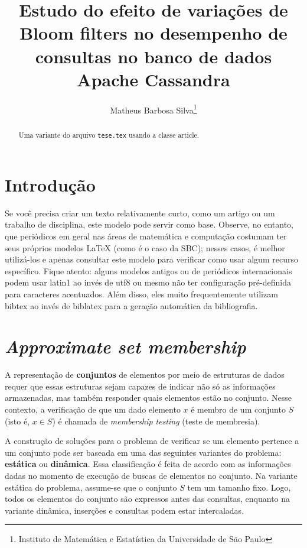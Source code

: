 \documentclass[12pt,twoside,english,brazilian]{article}
\title{Estudo do efeito de variações de Bloom filters no desempenho de consultas no banco de dados Apache Cassandra}
\author{
  Matheus Barbosa Silva\thanks{Instituto de Matemática e Estatística da Universidade de São Paulo}
}
\date{}
\begin{document}
\maketitle

\begin{abstract}
  Uma variante do arquivo \texttt{tese.tex} usando a classe \textsf{article}.
\end{abstract}

\section{Introdução}

Se você precisa criar um texto relativamente curto, como um artigo ou
um trabalho de disciplina, este modelo pode servir como base. Observe,
no entanto, que periódicos em geral nas áreas de matemática e computação
costumam ter seus próprios modelos \LaTeX{} (como é o caso da
SBC\nocite{sbctemplate});
nesses casos, é melhor utilizá-los e apenas consultar este modelo para
verificar como usar algum recurso específico. Fique atento: alguns modelos
antigos ou de periódicos internacionais podem usar \textsf{latin1} ao
invés de \textsf{utf8} ou mesmo não ter configuração pré-definida para
caracteres acentuados. Além disso, eles muito frequentemente utilizam
bibtex ao invés de biblatex para a geração automática da bibliografia.

\newpage

\section{\textit{Approximate set membership}}

A representação de \textbf{conjuntos} de elementos por meio de estruturas de dados requer que essas estruturas sejam capazes de indicar não só as informações armazenadas, mas também responder quais elementos estão no conjunto. Nesse contexto, a verificação de que um dado elemento $x$ é membro de um conjunto $S$ (isto é, $x \in S$) é chamada de \textit{membership testing} (teste de membresia).

A construção de soluções para o problema de verificar se um elemento pertence a um conjunto pode ser baseada em uma das seguintes variantes do problema: \textbf{estática} ou \textbf{dinâmica}. Essa classificação é feita de acordo com as informações dadas no momento de execução de buscas de elementos no conjunto. Na variante estática do problema, assume-se que o conjunto $S$ tem um tamanho fixo. Logo, todos os elementos do conjunto são expressos antes das consultas, enquanto na variante dinâmica, inserções e consultas podem estar intercaladas.
\end{document}

